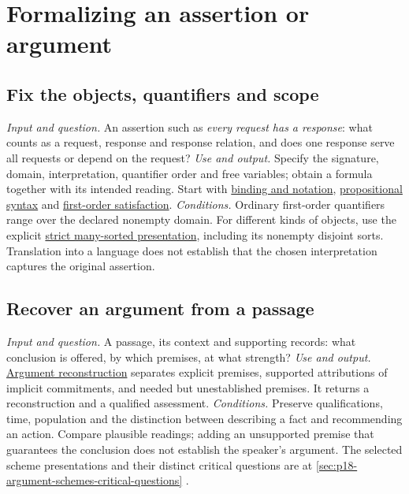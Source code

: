 \section{Formalizing an assertion or argument}
\label{sec:p14-finder-formalizing}

\subsection{Fix the objects, quantifiers and scope}
\label{sec:p14-finder-language}
\textit{Input and question.} An assertion such as \emph{every request has a
response}: what counts as a request, response and response relation, and does
one response serve all requests or depend on the request?
\textit{Use and output.} Specify the signature, domain, interpretation,
quantifier order and free variables; obtain a formula together with its
intended reading. Start with
\hyperref[sec:p01-symbol-registry]{binding and notation},
\hyperref[sec:prop-syntax-semantics-01]{propositional syntax} and
\hyperref[sec:fol-semantics-02]{first-order satisfaction}.
\textit{Conditions.} Ordinary first-order quantifiers range over the declared
nonempty domain. For different kinds of objects, use the explicit
\hyperref[sec:p02-many-sorted]{strict many-sorted presentation}, including its
nonempty disjoint sorts. Translation into a language does not establish that
the chosen interpretation captures the original assertion.

\subsection{Recover an argument from a passage}
\label{sec:p14-finder-reconstruction}
\textit{Input and question.} A passage, its context and supporting records:
what conclusion is offered, by which premises, at what strength?
\textit{Use and output.}
\hyperref[def:p18-scheme-reconstruction-method]{Argument reconstruction}
separates explicit premises, supported attributions of implicit commitments,
and needed but unestablished premises. It returns a reconstruction and a
qualified assessment.
\textit{Conditions.} Preserve qualifications, time, population and the
distinction between describing a fact and recommending an action. Compare
plausible readings; adding an unsupported premise that guarantees the
conclusion does not establish the speaker's argument.
The selected scheme presentations and their distinct critical questions are
at \cref{sec:p18-argument-schemes-critical-questions}
\cite[pp.~271--272, 277--283]{GoddenWalton2007SchemesQuestions}.

